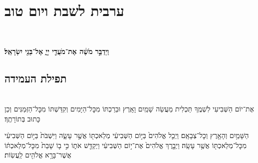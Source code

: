 \documentclass[twoside, openany, parskip=half, 11pt]{book}
\begin{document}
\sofberakhot


\mournerskaddish

\vspace{\baselineskip}

\chapter[ערבית לשבת ויו״ט]{ ערבית לשבת ויום טוב }

\barachu

\hamaarivaravim

\ahavasolam

\shema

\veahavta

\vehaya

\vayomer{}

\emesveemuna


\\
\veshameru


\textbf{
וַיְדַבֵּ֣ר מֹשֶׁ֔ה אֶת־מֹעֲדֵ֖י יְיָ֑ אֶל־בְּנֵ֖י יִשְׂרָאֵֽל׃
}



\halfkaddish

\section[תפילת העמידה]{ תפילת העמידה }

\amidaopening{\shabbosshuva}{}

{}\\
אֶת־יוֹם הַשְּׁבִיעִי לִשְׁמֶֽךָ תַּכְלִית מַעֲשֵׂה שָׁמַֽיִם וָאָֽרֶץ וּבֵרַכְתּוֹ מִכׇּל־הַיָּמִים וְקִדַּשְׁתּוֹ מִכׇּל־הַזְּמַנִּים וְכֵן כָּתוּב בְּתוֹרָתֶֽךָ׃

הַשָּׁמַ֥יִם וְהָאָ֖רֶץ וְכׇל־צְבָאָֽם׃ וַיְכַ֤ל אֱלֹהִים֙ בַּיּ֣וֹם הַשְּׁבִיעִ֔י מְלַאכְתּ֖וֹ אֲשֶׁ֣ר עָשָׂ֑ה וַיִּשְׁבֹּת֙ בַּיּ֣וֹם הַשְּׁבִיעִ֔י מִכׇּל־מְלַאכְתּ֖וֹ אֲשֶׁ֥ר עָשָֽׂה׃ וַיְבָ֤רֶךְ אֱלֹהִים֙ אֶת־י֣וֹם הַשְּׁבִיעִ֔י וַיְקַדֵּ֖שׁ אֹת֑וֹ כִּ֣י ב֤וֹ שָׁבַת֙ מִכׇּל־מְלַאכְתּ֔וֹ אֲשֶׁר־בָּרָ֥א אֱלֹהִ֖ים לַֽעֲשֽׂוֹת׃

\shabboskiddushhayom{}

\sepline
\end{document}
